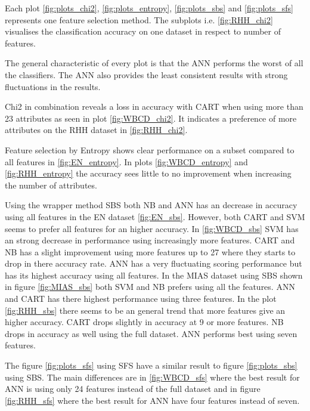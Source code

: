 Each plot \ref{fig:plots_chi2}, \ref{fig:plots_entropy}, \ref{fig:plots_sbs} and \ref{fig:plots_sfs} represents one feature selection method. The subplots i.e. \ref{fig:RHH_chi2} visualises the classification accuracy on one dataset in respect to number of features.

The general characteristic of every plot is that the ANN performs the worst of all the classifiers. The ANN also provides the least consistent results with strong fluctuations in the results.

Chi2 in combination reveals a loss in accuracy with CART when using more than 23 attributes as seen in plot \ref{fig:WBCD_chi2}. It indicates a preference of more attributes on the RHH dataset in \ref{fig:RHH_chi2}.

Feature selection by Entropy shows clear performance on a subset compared to all features in \ref{fig:EN_entropy}. In plots \ref{fig:WBCD_entropy} and \ref{fig:RHH_entropy} the accuracy sees little to no improvement when increasing the number of attributes.

Using the wrapper method SBS both NB and ANN has an decrease in accuracy using all features in the EN dataset \ref{fig:EN_sbs}. However, both CART and SVM seems to prefer all features for an higher accuracy. In \ref{fig:WBCD_sbs} SVM has an strong decrease in performance using increasingly more features. CART and NB has a slight improvement using more features up to 27 where they starts to drop in there accuracy rate.  ANN has a very fluctuating scoring performance but has its highest accuracy using all features.  In the MIAS dataset using SBS shown in figure \ref{fig:MIAS_sbs} both SVM and NB prefers using all the features. ANN and CART has there highest performance using three features. In the plot \ref{fig:RHH_sbs} there seems to be an general trend that more features give an higher accuracy. CART drops slightly in accuracy at 9 or more features. NB drops in accuracy as well using the full dataset. ANN performs best using seven features.

The figure \ref{fig:plots_sfs} using SFS have a similar result to figure \ref{fig:plots_sbs} using SBS. The main differences are in \ref{fig:WBCD_sfs} where the best result for ANN is using only 24 features instead of the full dataset and in figure \ref{fig:RHH_sfs} where the best result for ANN have four features instead of seven.


